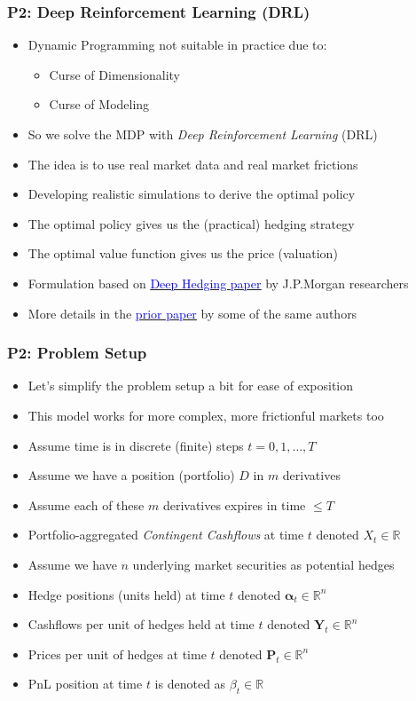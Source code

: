 \documentclass[handout]{beamer}
\begin{document}
\begin{frame}
\frametitle{P2: Deep Reinforcement Learning (DRL)}
\pause
\begin{itemize}[<+->]
\item Dynamic Programming not suitable in practice due to:
\begin{itemize}
\item Curse of Dimensionality
\item Curse of Modeling
\end{itemize}
\item So we solve the MDP with {\em Deep Reinforcement Learning} (DRL)
\item The idea is to use real market data and real market frictions
\item Developing realistic simulations to derive the optimal policy
\item The optimal policy gives us the (practical) hedging strategy
\item The optimal value function gives us the price (valuation)
\item Formulation based on \href{https://papers.ssrn.com/sol3/papers.cfm?abstract_id=3355706}{\underline{\textcolor{blue}{Deep Hedging paper}}} by J.P.Morgan researchers
\item More details in the \href{https://papers.ssrn.com/sol3/papers.cfm?abstract_id=3355706}{\underline{\textcolor{blue}{prior paper}}} by some of the same authors
\end{itemize}
\end{frame}

\begin{frame}
\frametitle{P2: Problem Setup}
\pause
\begin{itemize}[<+->]
\item Let's simplify the problem setup a bit for ease of exposition
\item This model works for more complex, more frictionful markets too
\item Assume time is in discrete (finite) steps $t = 0, 1, \ldots, T$
\item Assume we have a position (portfolio) $D$ in $m$ derivatives
\item Assume each of these $m$ derivatives expires in time $ \leq T$
\item Portfolio-aggregated {\em Contingent Cashflows} at time $t$ denoted $X_t \in \mathbb{R}$
\item Assume we have $n$ underlying market securities as potential hedges
\item Hedge positions (units held) at time $t$ denoted $\bm{\alpha}_t \in \mathbb{R}^n$
\item Cashflows per unit of hedges held at time $t$ denoted $\bm{Y}_t \in \mathbb{R}^n$
\item Prices per unit of hedges at time $t$ denoted $\bm{P}_t \in \mathbb{R}^n$
\item PnL position at time $t$ is denoted as $\beta_t \in \mathbb{R}$
\end{itemize}
\end{frame}
\end{document}
